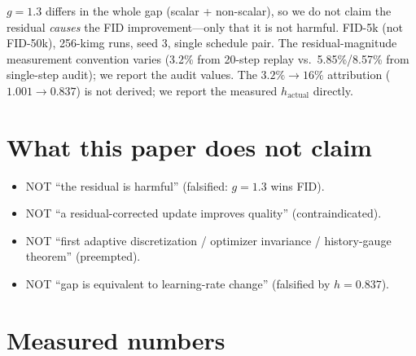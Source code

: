 \documentclass[11pt,a4paper]{article}
\begin{document}
$g=1.3$ differs in the whole gap (scalar + non-scalar), so we do not claim the
residual \emph{causes} the FID improvement---only that it is not harmful.
FID-5k (not FID-50k), 256-kimg runs, seed 3, single schedule pair. The
residual-magnitude measurement convention varies (3.2\% from 20-step replay vs.\
5.85\%/8.57\% from single-step audit); we report the audit values. The
$3.2\%\to16\%$ attribution ($1.001\to0.837$) is not derived; we report the
measured $h_{\mathrm{actual}}$ directly.

\section{What this paper does not claim}
\label{sec:notclaim}

\begin{itemize}
  \item NOT ``the residual is harmful'' (falsified: $g=1.3$ wins FID).
  \item NOT ``a residual-corrected update improves quality'' (contraindicated).
  \item NOT ``first adaptive discretization / optimizer invariance / history-gauge
        theorem'' (preempted).
  \item NOT ``gap is equivalent to learning-rate change'' (falsified by
        $h=0.837$).
\end{itemize}

\section{Measured numbers}
\label{sec:numbers}
\end{document}
